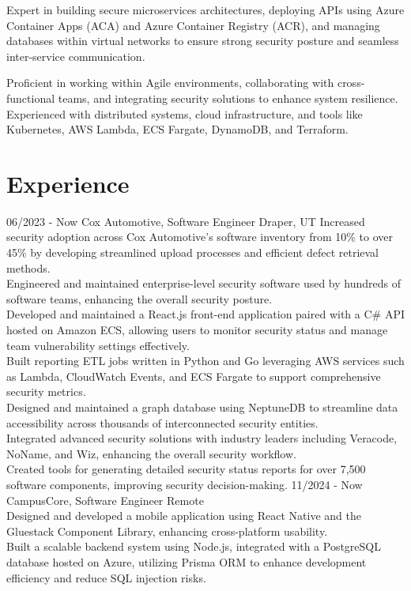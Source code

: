\documentclass[]{friggeri-cv}
\begin{document}
Expert in building secure microservices architectures, deploying APIs using Azure Container Apps (ACA) and Azure Container Registry (ACR), and managing databases within virtual networks to ensure strong security posture and seamless inter-service communication.

Proficient in working within Agile environments, collaborating with cross-functional teams, and integrating security solutions to enhance system resilience. Experienced with distributed systems, cloud infrastructure, and tools like Kubernetes, AWS Lambda, ECS Fargate, DynamoDB, and Terraform.
\section{Experience}
\begin{entrylist}
	  \entry
	{06/2023 - Now}
	{Cox Automotive, Software Engineer}
	{Draper, UT}
	{ 
    Increased security adoption across Cox Automotive's software inventory from 10\% to over 45\% by developing streamlined upload processes and efficient defect retrieval methods.
    \\ Engineered and maintained enterprise-level security software used by hundreds of software teams, enhancing the overall security posture.
    \\ Developed and maintained a React.js front-end application paired with a C\# API hosted on Amazon ECS, allowing users to monitor security status and manage team vulnerability settings effectively.
    \\ Built reporting ETL jobs written in Python and Go leveraging AWS services such as Lambda, CloudWatch Events, and ECS Fargate to support comprehensive security metrics.
    \\ Designed and maintained a graph database using NeptuneDB to streamline data accessibility across thousands of interconnected security entities.
    \\ Integrated advanced security solutions with industry leaders including Veracode, NoName, and Wiz, enhancing the overall security workflow.
    \\ Created tools for generating detailed security status reports for over 7,500 software components, improving security decision-making.
  }
  \entry
    {11/2024 - Now}
    {CampusCore, Software Engineer}
    {Remote}
    {
    \\Designed and developed a mobile application using React Native and the Gluestack Component Library, enhancing cross-platform usability.
    \\Built a scalable backend system using Node.js, integrated with a PostgreSQL database hosted on Azure, utilizing Prisma ORM to enhance development efficiency and reduce SQL injection risks.
}
\end{entrylist}
\end{document}
